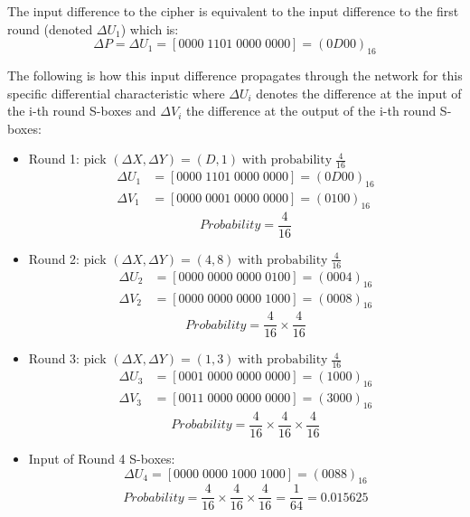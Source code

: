 \documentclass[letterpaper,12pt]{article}
\begin{document}
The input difference to the cipher is equivalent to the input difference to the first round (denoted $\Delta U_{1}$) which is:
\[
    \Delta P = \Delta U_{1} = [0000\;1101\;0000\;0000] = (0D00)_{16}
\]

The following is how this input difference propagates through the network for this specific differential characteristic where $\Delta U_{i}$
denotes the difference at the input of the i-th round S-boxes and $\Delta V_{i}$ the difference at the output of the i-th round S-boxes:\\

\begin{itemize}
    \item Round 1:  pick $ (\Delta X, \Delta Y) = (D, 1) \; \text{with probability} \; \frac{4}{16} $
    \begin{align*}
        \Delta U_{1} &=[0000\;1101\;0000\;0000] = (0D00)_{16} \\
        \Delta V_{1} &= [0000\;0001\;0000\;0000] = (0100)_{16}
    \end{align*}
    \[
        Probability = \frac{4}{16}
    \]

    \item Round 2:  pick $ (\Delta X, \Delta Y) = (4, 8) \; \text{with probability} \; \frac{4}{16} $
    \begin{align*}
        \Delta U_{2} &= [0000\;0000\;0000\;0100] = (0004)_{16} \\
        \Delta V_{2} &= [0000\;0000\;0000\;1000] = (0008)_{16}
    \end{align*}
    \[
        Probability = \frac{4}{16} \times \frac{4}{16}
    \]

    \item Round 3:  pick $ (\Delta X, \Delta Y) = (1, 3) \; \text{with probability} \; \frac{4}{16} $
    \begin{align*}
        \Delta U_{3} &= [0001\;0000\;0000\;0000] = (1000)_{16} \\
        \Delta V_{3} &= [0011\;0000\;0000\;0000] = (3000)_{16}
    \end{align*}
    \[
        Probability = \frac{4}{16} \times \frac{4}{16} \times \frac{4}{16}
    \]

    \item Input of Round 4 S-boxes: \\
    \begin{equation}
        \Delta U_{4} = [0000\;0000\;1000\;1000] = (0088)_{16}
    \end{equation}
    \[
        Probability = \frac{4}{16} \times \frac{4}{16} \times \frac{4}{16} = \frac{1}{64} = 0.015625 \label{eq:inputdiff}
    \]

\end{itemize}
\end{document}
